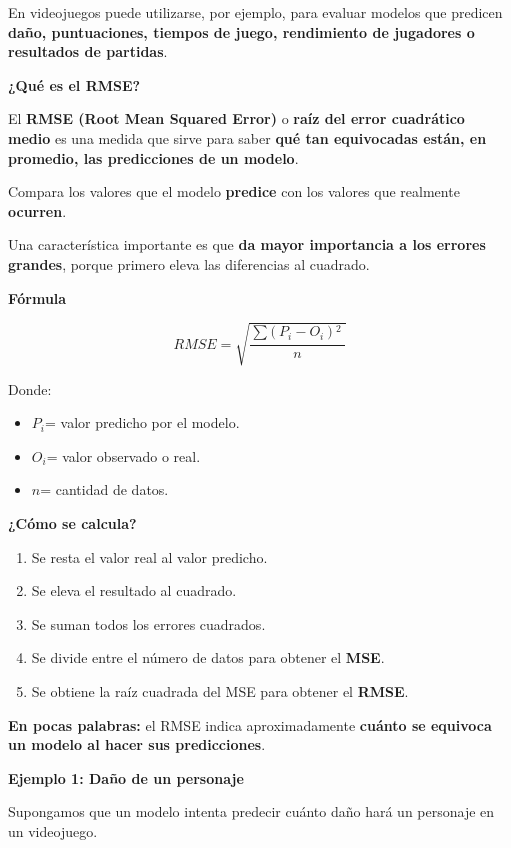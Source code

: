 \documentclass[]{article}
\begin{document}
En videojuegos puede utilizarse, por ejemplo, para evaluar modelos que
predicen \textbf{daño, puntuaciones, tiempos de juego, rendimiento de
jugadores o resultados de partidas}.

\textbf{¿Qué es el RMSE?}

El \textbf{RMSE (Root Mean Squared Error)} o \textbf{raíz del error
cuadrático medio} es una medida que sirve para saber \textbf{qué tan
equivocadas están, en promedio, las predicciones de un modelo}.

Compara los valores que el modelo \textbf{predice} con los valores que
realmente \textbf{ocurren}.

Una característica importante es que \textbf{da mayor importancia a los
errores grandes}, porque primero eleva las diferencias al cuadrado.

\textbf{Fórmula}

\[RMSE = \sqrt{\frac{\sum_{}^{}(\left. \ P_{i} - O_{i}\left. \ ) \right.\ ^{2} \right.\ }{n}}\]

Donde:

\begin{itemize}
\item
  \(P_{i}\)= valor predicho por el modelo.
\item
  \(O_{i}\)= valor observado o real.
\item
  \(n\)= cantidad de datos.
\end{itemize}

\textbf{¿Cómo se calcula?}

\begin{enumerate}
\def\labelenumi{\arabic{enumi}.}
\item
  Se resta el valor real al valor predicho.
\item
  Se eleva el resultado al cuadrado.
\item
  Se suman todos los errores cuadrados.
\item
  Se divide entre el número de datos para obtener el \textbf{MSE}.
\item
  Se obtiene la raíz cuadrada del MSE para obtener el \textbf{RMSE}.
\end{enumerate}

\textbf{En pocas palabras:} el RMSE indica aproximadamente
\textbf{cuánto se equivoca un modelo al hacer sus predicciones}.

\textbf{Ejemplo 1: Daño de un personaje}

Supongamos que un modelo intenta predecir cuánto daño hará un personaje
en un videojuego.
\end{document}
